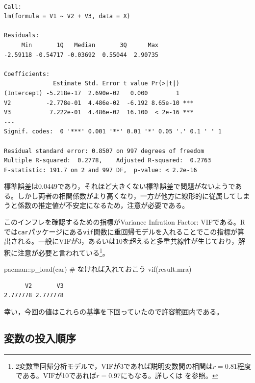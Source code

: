 \documentclass[
  a4paper,
]{ltjsbook}
\newenvironment{Shaded}{\begin{snugshade}}{\end{snugshade}}
\newcommand{\CommentTok}[1]{\textcolor[rgb]{0.37,0.37,0.37}{#1}}
\newcommand{\FunctionTok}[1]{\textcolor[rgb]{0.28,0.35,0.67}{#1}}
\newcommand{\NormalTok}[1]{\textcolor[rgb]{0.00,0.23,0.31}{#1}}
\newcommand{\SpecialCharTok}[1]{\textcolor[rgb]{0.37,0.37,0.37}{#1}}
\begin{document}
\begin{verbatim}

Call:
lm(formula = V1 ~ V2 + V3, data = X)

Residuals:
     Min       1Q   Median       3Q      Max 
-2.59118 -0.54717 -0.03692  0.55044  2.90735 

Coefficients:
              Estimate Std. Error t value Pr(>|t|)    
(Intercept) -5.218e-17  2.690e-02   0.000        1    
V2          -2.778e-01  4.486e-02  -6.192 8.65e-10 ***
V3           7.222e-01  4.486e-02  16.100  < 2e-16 ***
---
Signif. codes:  0 '***' 0.001 '**' 0.01 '*' 0.05 '.' 0.1 ' ' 1

Residual standard error: 0.8507 on 997 degrees of freedom
Multiple R-squared:  0.2778,    Adjusted R-squared:  0.2763 
F-statistic: 191.7 on 2 and 997 DF,  p-value: < 2.2e-16
\end{verbatim}

標準誤差は0.0449であり，それほど大きくない標準誤差で問題がないようである。しかし両者の相関係数がより高くなり，一方が他方に線形的に従属してしまうと係数の推定値が不安定になるため，注意が必要である。

このインフレを確認するための指標がVariance Infration Factor:
VIFである。Rでは\texttt{car}パッケージにある\texttt{vif}関数に重回帰モデルを入れることでこの指標が算出される。一般にVIFが3，あるいは10を超えると多重共線性が生じており，解釈に注意が必要と言われている\footnote{2変数重回帰分析モデルで，VIFが3であれば説明変数間の相関は\(r=0.81\)程度である。VIFが10であれば\(r=0.97\)にもなる。詳しくは
  \textcite{kosugi2023} を参照。}。

\begin{Shaded}
\begin{Highlighting}[]
\NormalTok{pacman}\SpecialCharTok{::}\FunctionTok{p\_load}\NormalTok{(car) }\CommentTok{\# なければ入れておこう}
\FunctionTok{vif}\NormalTok{(result.mra)}
\end{Highlighting}
\end{Shaded}

\begin{verbatim}
      V2       V3 
2.777778 2.777778 
\end{verbatim}

幸い，今回の値はこれらの基準を下回っていたので許容範囲内である。

\subsection{変数の投入順序}\label{ux5909ux6570ux306eux6295ux5165ux9806ux5e8f}
\end{document}
